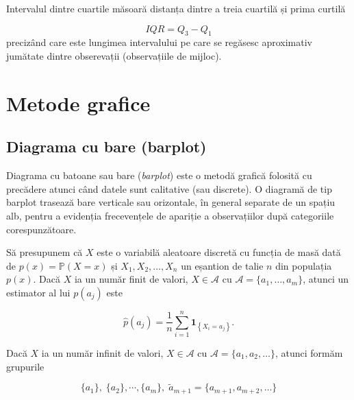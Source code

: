 \documentclass[]{article}
\newenvironment{Shaded}{\begin{snugshade}}{\end{snugshade}}
\newcommand{\KeywordTok}[1]{\textcolor[rgb]{0.13,0.29,0.53}{\textbf{#1}}}
\newcommand{\DecValTok}[1]{\textcolor[rgb]{0.00,0.00,0.81}{#1}}
\newcommand{\FloatTok}[1]{\textcolor[rgb]{0.00,0.00,0.81}{#1}}
\newcommand{\StringTok}[1]{\textcolor[rgb]{0.31,0.60,0.02}{#1}}
\newcommand{\OperatorTok}[1]{\textcolor[rgb]{0.81,0.36,0.00}{\textbf{#1}}}
\newcommand{\NormalTok}[1]{#1}
\begin{document}
Intervalul dintre cuartile măsoară distanța dintre a treia cuartilă și
prima curtilă

\[
  IQR = Q_3 - Q_1
\] precizând care este lungimea intervalului pe care se regăsesc
aproximativ jumătate dintre obserevații (observațiile de mijloc).

\begin{Shaded}
\end{Shaded}

\section{Metode grafice}\label{metode-grafice}

\subsection{Diagrama cu bare (barplot)}\label{diagrama-cu-bare-barplot}

Diagrama cu batoane sau bare (\emph{barplot}) este o metodă grafică
folosită cu precădere atunci când datele sunt calitative (sau discrete).
O diagramă de tip barplot trasează bare verticale sau orizontale, în
general separate de un spațiu alb, pentru a evidenția frecevențele de
apariție a observațiilor după categoriile corespunzătoare.

Să presupunem că \(X\) este o variabilă aleatoare discretă cu funcția de
masă dată de \(p(x)=\mathbb{P}(X = x)\) și \(X_1, X_2, \ldots, X_n\) un
eșantion de talie \(n\) din populația \(p(x)\). Dacă \(X\) ia un număr
finit de valori, \(X\in\mathcal{A}\) cu
\(\mathcal{A} = \{a_1, \ldots, a_m\}\), atunci un estimator al lui
\(p(a_j)\) este

\[
  \hat{p}(a_j) = \frac{1}{n}\sum_{i = 1}^{n}\mathbf{1}_{\left\{X_i = a_j\right\}}.
\]

Dacă \(X\) ia un număr infinit de valori, \(X\in\mathcal{A}\) cu
\(\mathcal{A} = \{a_1, a_2, \ldots\}\), atunci formăm grupurile

\[
  \{a_1\}, \;\{a_2\},\cdots, \{a_m\},\; \tilde{a}_{m+1} = \{a_{m+1}, a_{m+2}, \ldots\}
\]
\end{document}
